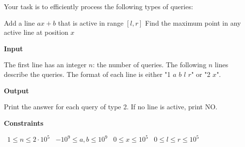 Your task is to efficiently process the following types of queries:

Add a line $ax+b$ that is active in range $[l,r]$
Find the maximum point in any active line at position $x$

\vspace{0.3cm}\noindent\textbf{Input}

The first line has an integer $n$: the number of queries.
The following $n$ lines describe the queries. The format of each line is either "1 $a$ $b$ $l$ $r$" or "2 $x$".

\vspace{0.3cm}\noindent\textbf{Output}

Print the answer for each query of type 2. If no line is active, print NO.

\vspace{0.3cm}\noindent\textbf{Constraints}

\textbullet\ $1 \le n \le 2 \cdot 10^5$
\textbullet\ $-10^9 \le a,b \le 10^9$
\textbullet\ $0 \le x \le 10^5$
\textbullet\ $0 \le l \le r \le 10^5$